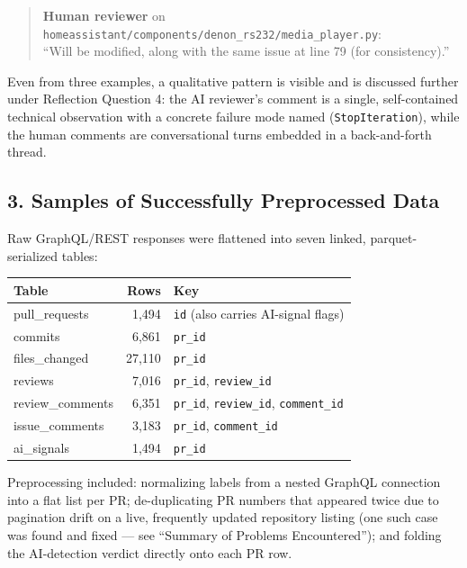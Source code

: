 \documentclass{experimentreport}
\begin{document}
{\begin{quote}
\textbf{Human reviewer} on \texttt{homeassistant/components/denon\_rs232/media\_player.py}: \\
``Will be modified, along with the same issue at line 79 (for consistency).''
\end{quote}

Even from three examples, a qualitative pattern is visible and is discussed further under
Reflection Question 4: the AI reviewer's comment is a single, self-contained technical
observation with a concrete failure mode named (\texttt{StopIteration}), while the human
comments are conversational turns embedded in a back-and-forth thread.

\subsection*{3. Samples of Successfully Preprocessed Data}

Raw GraphQL/REST responses were flattened into seven linked, parquet-serialized tables:

\begin{center}
\begin{tabular}{|l|r|l|}
\hline
\textbf{Table} & \textbf{Rows} & \textbf{Key} \\
\hline
pull\_requests & 1{,}494 & \texttt{id} (also carries AI-signal flags) \\
commits & 6{,}861 & \texttt{pr\_id} \\
files\_changed & 27{,}110 & \texttt{pr\_id} \\
reviews & 7{,}016 & \texttt{pr\_id}, \texttt{review\_id} \\
review\_comments & 6{,}351 & \texttt{pr\_id}, \texttt{review\_id}, \texttt{comment\_id} \\
issue\_comments & 3{,}183 & \texttt{pr\_id}, \texttt{comment\_id} \\
ai\_signals & 1{,}494 & \texttt{pr\_id} \\
\hline
\end{tabular}
\end{center}

Preprocessing included: normalizing labels from a nested GraphQL connection into a flat list per
PR; de-duplicating PR numbers that appeared twice due to pagination drift on a live, frequently
updated repository listing (one such case was found and fixed --- see ``Summary of Problems
Encountered''); and folding the AI-detection verdict directly onto each PR row.

}
\end{document}
